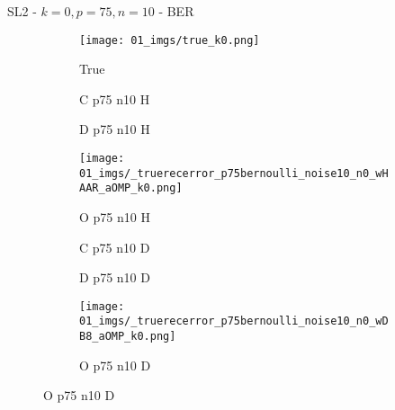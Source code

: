 \begin{frame}{SL2 - $k=0,p=75,n=10$ - BER}{}
\begin{figure}
\begin{subfigure}{0.13\textwidth}
\texttt{[image: 01\_imgs/true\_k0.png]}
\caption*{\tiny True}
\end{subfigure}
\begin{subfigure}{0.13\textwidth}
\caption*{\tiny C p75 n10 H}
\end{subfigure}
\begin{subfigure}{0.13\textwidth}
\caption*{\tiny D p75 n10 H}
\end{subfigure}
\begin{subfigure}{0.13\textwidth}
\texttt{[image: 01\_imgs/\_truerecerror\_p75bernoulli\_noise10\_n0\_wHAAR\_aOMP\_k0.png]}
\caption*{\tiny O p75 n10 H}
\end{subfigure}
\begin{subfigure}{0.13\textwidth}
\caption*{\tiny C p75 n10 D}
\end{subfigure}
\begin{subfigure}{0.13\textwidth}
\caption*{\tiny D p75 n10 D}
\end{subfigure}
\begin{subfigure}{0.13\textwidth}
\texttt{[image: 01\_imgs/\_truerecerror\_p75bernoulli\_noise10\_n0\_wDB8\_aOMP\_k0.png]}
\caption*{\tiny O p75 n10 D}
\end{subfigure}
\end{figure}
\end{frame}

